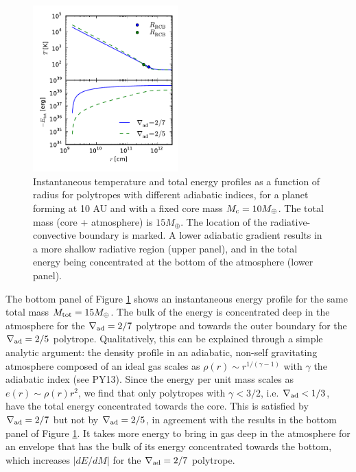 \documentclass[apj]{emulateapj}
\newcommand{\delad}{\nabla_{\rm ad}}
\begin{document}
\begin{figure}[h]
\centering
\includegraphics[width=0.5\textwidth]{../../figs/ModelAtmospheres/RadSelfGravRealEOS/PaperFigs/TErplot_poly.pdf}
\caption{Instantaneous temperature and total energy profiles as a function of radius for polytropes with different adiabatic indices, for a planet forming at 10 AU and with a fixed core mass $M_{\rm c}=10 M_{\oplus}$. The total mass (core + atmosphere) is $15 M_{\oplus}$. The location of the radiative-convective boundary is marked. A lower adiabatic gradient results in a more shallow radiative region (upper panel), and in the total energy being concentrated at the bottom of the atmosphere (lower panel).}
\label{fig:ETrplotpoly}
\end{figure}



The bottom panel of Figure \ref{fig:ETrplotpoly} shows an instantaneous energy profile for the same total mass $M_{\rm{tot}} = 15 M_{\oplus}$.  The bulk of the energy is concentrated deep in the atmosphere for the $\delad=2/7$ polytrope and towards the outer boundary for the $\delad=2/5$ polytrope. Qualitatively, this can be explained through a simple analytic argument: the density profile in an adiabatic, non-self gravitating atmosphere composed of an ideal gas scales as $\rho(r) \sim r^{1/(\gamma-1)}$ with $\gamma$ the adiabatic index (see PY13). Since the energy per unit mass scales as $e(r) \sim \rho(r) r^2$, we find that only polytropes with $\gamma<3/2$, i.e. $\delad<1/3$, have the total energy concentrated towards the core. This is satisfied by $\delad=2/7$ but not by $\delad=2/5$, in agreement with the results in the bottom panel of Figure \ref{fig:ETrplotpoly}.  It takes more energy to bring in gas deep in the atmosphere for an envelope that has the bulk of its energy concentrated towards the bottom,  which increases $|dE/dM|$ for the $\delad=2/7$ polytrope. 
\end{document}
